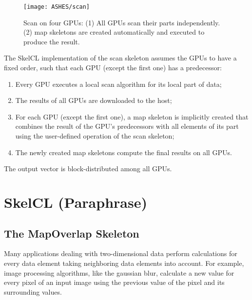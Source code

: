 \begin{figure*}[tbp]
    \centering
    \texttt{[image: ASHES/scan]}
    \caption{Scan on four GPUs: (1) All GPUs scan their parts independently.
            (2) map skeletons are created automatically and
             executed to produce the result.}
    \label{fig:scan}
\end{figure*}

The SkelCL implementation of the scan skeleton assumes the GPUs to have a fixed order, such that each GPU (except the first one) has a predecessor:
\begin{enumerate}
 \item Every GPU executes a local scan algorithm for its local part of data;
 \item The results of all GPUs are downloaded to the host;
 \item For each GPU (except the first one), a map skeleton is implicitly created that combines the result of the GPU's predecessors with all elements of its part using the user-defined operation of the scan skeleton;
 \item The newly created map skeletons compute the final results on all GPUs.
\end{enumerate}
The output vector is block-distributed among all GPUs.




\section{SkelCL (Paraphrase)}

\subsection{The MapOverlap Skeleton}
Many applications dealing with two-dimensional data perform calculations for every data element taking neighboring data elements into account.
For example, image processing algorithms, like the gaussian blur, calculate a new value for every pixel of an input image using the previous value of the pixel and its surrounding values.


